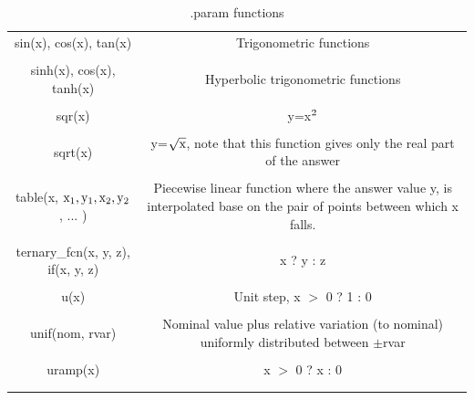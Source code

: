 \begin{longtable}{c c}
sin(x), cos(x), tan(x) & \begin{minipage}{20em}
Trigonometric functions
\end{minipage}\\ \\

sinh(x), cos(x), tanh(x) & \begin{minipage}{20em}
Hyperbolic trigonometric functions
\end{minipage}\\ \\

sqr(x) & \begin{minipage}{20em}
y=x$\rm{^2}$
\end{minipage}\\ \\

sqrt(x) & \begin{minipage}{20em}
y=$\sqrt{\rm{x}}$, note that this function gives only the real part of the answer
\end{minipage}\\ \\

table(x, $\rm{x_1,y_1, x_2,y_2}$, ... ) & \begin{minipage}{20em}
Piecewise linear function where the answer value y, is interpolated base on the pair of points between which x falls.
\end{minipage}\\ \\

ternary\_fcn(x, y, z), if(x, y, z) & \begin{minipage}{20em}
x ? y : z
\end{minipage}\\ \\

u(x) & \begin{minipage}{20em}
Unit step, x $>$ 0 ? 1 : 0
\end{minipage}\\ \\

unif(nom, rvar) & \begin{minipage}{20em}
Nominal value plus relative variation (to nominal) uniformly distributed between $\pm$rvar
\end{minipage}\\ \\

uramp(x) & \begin{minipage}{20em}
x $>$ 0 ? x : 0
\end{minipage}\\ \\[1ex] %
\hline %

\caption{.param functions}
\label {tab:paramfuncs}
\end{longtable}

